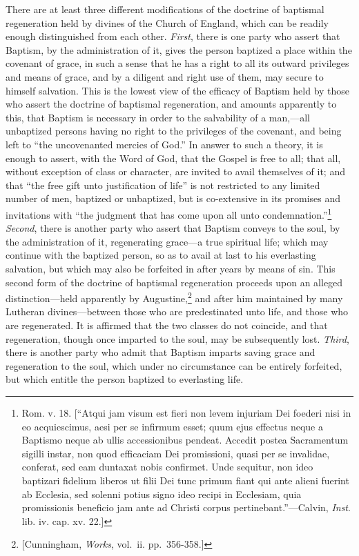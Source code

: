 \documentclass[english,]{book}
\begin{document}
There are at least three different modifications of the doctrine of baptismal regeneration held by divines of the Church of England, which can be readily enough distinguished from each other. \emph{First}, there is one party who assert that Baptism, by the administration of it, gives the person baptized a place within the covenant of grace, in such a sense that he has a right to all its outward privileges and means of grace, and by a diligent and right use of them, may secure to himself salvation. This is the lowest view of the efficacy of Baptism held by those who assert the doctrine of baptismal regeneration, and amounts apparently to this, that Baptism is necessary in order to the salvability of a man,---all unbaptized persons having no right to the privileges of the covenant, and being left to ``the uncovenanted mercies of God.'' In answer to such a theory, it is enough to assert, with the Word of God, that the Gospel is free to all; that all, without exception of class or character, are invited to avail themselves of it; and that ``the free gift unto justification of life'' is not restricted to any limited number of men, baptized or unbaptized, but is co-extensive in its promises and invitations with ``the judgment that has come upon all unto condemnation.''\footnote{Rom. v. 18. {[}``Atqui jam visum est fieri non levem injuriam Dei foederi nisi in eo acquiescimus, aesi per se infirmum esset; quum ejus effectus neque a Baptismo neque ab ullis accessionibus pendeat. Accedit postea Sacramentum sigilli instar, non quod efficaciam Dei promissioni, quasi per se invalidae, conferat, sed eam duntaxat nobis confirmet. Unde sequitur, non ideo baptizari fidelium liberos ut filii Dei tunc primum fiant qui ante alieni fuerint ab Ecclesia, sed solenni potius signo ideo recipi in Ecclesiam, quia promissionis beneficio jam ante ad Christi corpus pertinebant.''---Calvin, \emph{Inst}. lib. iv. cap. xv. 22.{]}} \emph{Second}, there is another party who assert that Baptism conveys to the soul, by the administration of it, regenerating grace---a true spiritual life; which may continue with the baptized person, so as to avail at last to his everlasting salvation, but which may also be forfeited in after years by means of sin. This second form of the doctrine of baptismal regeneration proceeds upon an alleged distinction---held apparently by Augustine,\footnote{{[}Cunningham, \emph{Works}, vol.~ii. pp.~356-358.{]}} and after him maintained by many Lutheran divines---between those who are predestinated unto life, and those who are regenerated. It is affirmed that the two classes do not coincide, and that regeneration, though once imparted to the soul, may be subsequently lost. \emph{Third}, there is another party who admit that Baptism imparts saving grace and regeneration to the soul, which under no circumstance can be entirely forfeited, but which entitle the person baptized to everlasting life.
\end{document}
